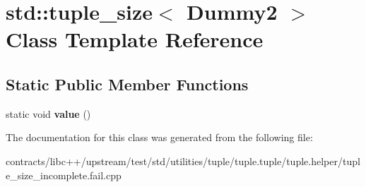 \hypertarget{classstd_1_1tuple__size_3_01_dummy2_01_4}{}\section{std\+:\+:tuple\+\_\+size$<$ Dummy2 $>$ Class Template Reference}
\label{classstd_1_1tuple__size_3_01_dummy2_01_4}
\subsection*{Static Public Member Functions}
\begin{DoxyCompactItemize}
\item 
\mbox{\label{classstd_1_1tuple__size_3_01_dummy2_01_4_a7555aa05e3adee42a7b014b0ed23e7aa}} 
static void {\bfseries value} ()
\end{DoxyCompactItemize}


The documentation for this class was generated from the following file\+:\begin{DoxyCompactItemize}
\item 
contracts/libc++/upstream/test/std/utilities/tuple/tuple.\+tuple/tuple.\+helper/tuple\+\_\+size\+\_\+incomplete.\+fail.\+cpp\end{DoxyCompactItemize}
